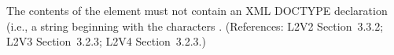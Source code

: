 The contents of the  element must not contain an XML
DOCTYPE declaration (i.e., a string beginning with the characters
.  (References: L2V2 Section~3.3.2;
L2V3 Section~3.2.3; L2V4 Section~3.2.3.)

